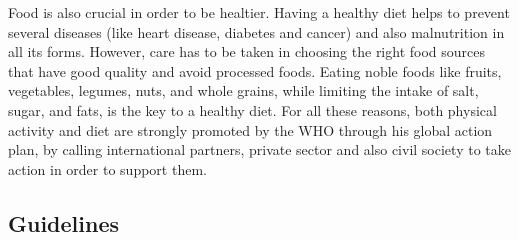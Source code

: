 \newline Food is also crucial in order to be healtier. Having a healthy diet helps to prevent several diseases (like heart disease, diabetes and cancer) and also malnutrition in all its forms. However, care has to be taken in choosing the right food sources that have good quality and avoid processed foods. Eating noble foods like fruits, vegetables, legumes, nuts, and whole grains, while limiting the intake of salt, sugar, and fats, is the key to a healthy diet. For all these reasons, both physical activity and diet are strongly promoted by the WHO through his global action plan, by calling international partners, private sector and also civil society to take action in order to support them. 
\subsection{Guidelines}
